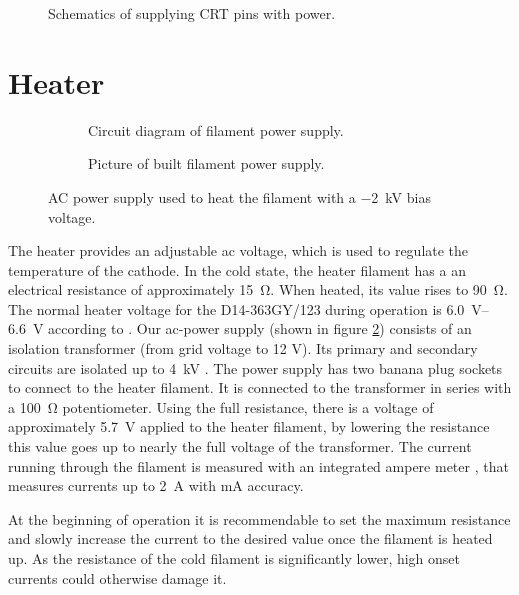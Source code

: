 \begin{figure}[H]
	\centering
	
	\begin{circuitikz}[european]
		
	\end{circuitikz}

	\caption{Schematics of supplying CRT pins with power.}
	\label{fig:schematics of wiring}
\end{figure}


\section{Heater}
\label{sec:Heater}

\begin{figure}[ht]
	\centering
	
	\begin{subfigure}[b]{0.9\textwidth}
		\begin{circuitikz}%
			
		\end{circuitikz}
		\caption{Circuit diagram of filament power supply.}
	\end{subfigure}
	
	\vspace{1cm}

	\begin{subfigure}[b]{0.9\textwidth}
		\caption{Picture of built filament power supply.}
	\end{subfigure}
	
	\caption{AC power supply used to heat the filament with a \SI{-2}{\kilo\volt} bias voltage.}
	\label{fig:heater_circuit}
\end{figure}

The heater provides an adjustable ac voltage, which is used to regulate the temperature of the cathode. In the cold state, the heater filament has a an electrical resistance of approximately \SI{15}{\ohm}. When heated, its value rises to \SI{90}{\ohm}. The normal heater voltage for the D14-363GY/123 during  operation is \SIrange{6.0}{6.6}{\volt} according to \cite{D14363GY123-manual}. 
Our ac-power supply (shown in figure \ref{fig:heater_circuit}) consists of an isolation transformer (from grid voltage to 12 V). Its primary  and secondary circuits are isolated up to \SI{4}{\kilo\volt} \cite{DS44231-DataSheet}. The power supply has two  banana plug sockets to connect to the heater filament. 
It is connected to the transformer in series with a \SI{100}{\ohm} potentiometer. Using the full resistance, there is a voltage of approximately \SI{5.7}{\volt} applied to the heater filament, by lowering the resistance this value goes up to nearly the full voltage of the transformer. 
The current running through the filament is measured with an integrated ampere meter \cite{ACA-20PC-manual}, that measures currents up to  \SI{2}{\ampere} with \si{\milli\ampere} accuracy.

At the beginning of operation it is recommendable to set the maximum resistance and slowly increase the current to the desired value once the filament is heated up. As the resistance of the cold filament is significantly lower, high onset currents could otherwise damage it.  
